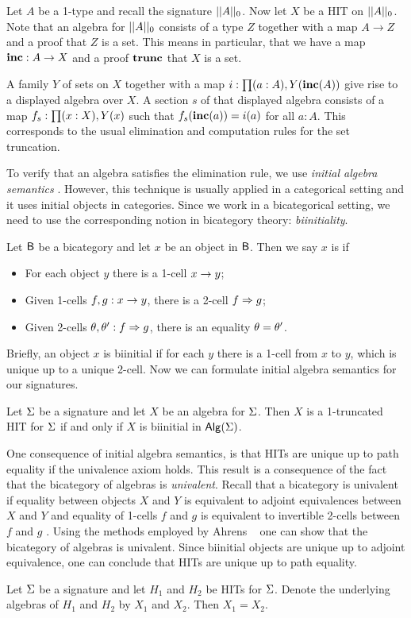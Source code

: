 \begin{example}
Let $A$ be a 1-type and recall the signature $|| A ||_0$.
Now let $X$ be a HIT on $|| A ||_0$.
Note that an algebra for $|| A ||_0$ consists of a type $Z$ together with a map $A \rightarrow Z$
and a proof that $Z$ is a set.
This means in particular, that we have a map $\operatorname{\mathbf{inc}} : A \rightarrow X$ and a proof $\operatorname{\mathbf{trunc}}$
that $X$ is a set.

A family $Y$ of sets on $X$ together with a map $i : \prod (a  : A) , Y(\operatorname{\mathbf{inc}}(A))$
give rise to a displayed algebra over $X$.
A section $s$ of that displayed algebra consists of a map $f_s : \prod (x : X) , Y(x)$
such that $f_s(\operatorname{\mathbf{inc}}(a)) = i(a)$ for all $a : A$.
This corresponds to the usual elimination and computation rules for the
set truncation.
\end{example}

To verify that an algebra satisfies the elimination rule, we use \emph{initial algebra semantics} \cite{hermida1998structural}.
However, this technique is usually applied in a categorical setting and it uses initial objects in categories.
Since we work in a bicategorical setting, we need to use the corresponding notion in bicategory theory: \emph{biinitiality}.

\begin{definition}
Let $\mathsf{B}$ be a bicategory and let $x$ be an object in $\mathsf{B}$.
Then we say $x$ is  if
\begin{itemize}
	\item For each object $y$ there is a 1-cell $x \rightarrow y$;
	\item Given 1-cells $f, g : x \rightarrow y$, there is a 2-cell $f \Rightarrow g$;
	\item Given 2-cells $\theta, \theta' : f \Rightarrow g$, there is an equality $\theta = \theta'$.
\end{itemize}
\end{definition}

Briefly, an object $x$ is biinitial if for each $y$ there is a 1-cell from $x$ to $y$, which is unique up to a unique 2-cell.
Now we can formulate initial algebra semantics for our signatures.

\begin{proposition}
\label{thm:initial_alg_sem}
Let $\Sigma$ be a signature and let $X$ be an algebra for $\Sigma$.
Then $X$ is a 1-truncated HIT for $\Sigma$ if and only if $X$ is biinitial in $\mathsf{Alg}(\Sigma)$.
\end{proposition}

One consequence of initial algebra semantics, is that HITs are unique up to path equality if the univalence axiom holds.
This result is a consequence of the fact that the bicategory of algebras is \emph{univalent}.
Recall that a bicategory is univalent if
equality between objects $X$ and $Y$ is equivalent to adjoint equivalences between $X$ and $Y$
and equality of 1-cells $f$ and $g$ is equivalent to invertible 2-cells between $f$ and $g$
\cite{bicatjournal}.
Using the methods employed by Ahrens \etal \ \cite{bicatjournal} one can show that the bicategory of algebras
is univalent.
Since biinitial objects are unique up to adjoint equivalence, one can conclude that HITs are unique up
to path equality.

\begin{proposition}
Let $\Sigma$ be a signature and let $H_1$ and $H_2$ be HITs for $\Sigma$.
Denote the underlying algebras of $H_1$ and $H_2$ by $X_1$ and $X_2$.
Then $X_1 = X_2$.
\end{proposition}
